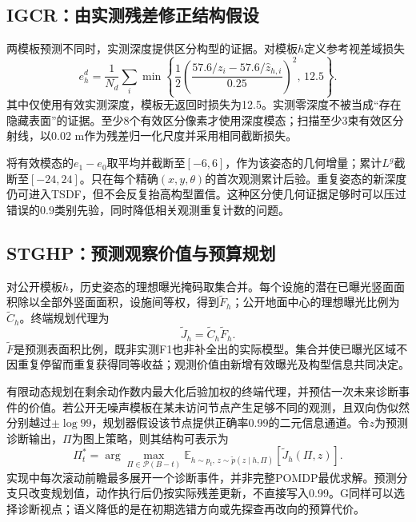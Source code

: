 \documentclass[11pt,a4paper]{article}
\begin{document}
\subsection{IGCR：由实测残差修正结构假设}
两模板预测不同时，实测深度提供区分构型的证据。对模板$h$定义参考视差域损失
\begin{equation}
e_h^d=\frac{1}{N_d}\sum_i
\min\!\left\{\frac12\left(\frac{57.6/z_i-57.6/\widehat z_{h,i}}{0.25}\right)^2,\,12.5\right\}.
\label{eq:residual}
\end{equation}
其中仅使用有效实测深度，模板无返回时损失为12.5。实测零深度不被当成“存在隐藏表面”的证据。至少8个有效区分像素才使用深度模态；扫描至少3束有效区分射线，以0.02 m作为残差归一化尺度并采用相同截断损失。

将有效模态的$e_1-e_0$取平均并截断至$[-6,6]$，作为该姿态的几何增量；累计$L^g$截断至$[-24,24]$。只在每个精确$(x,y,\theta)$的首次观测累计后验。重复姿态的新深度仍可进入TSDF，但不会反复抬高构型置信。这种区分使几何证据足够时可以压过错误的0.9类别先验，同时降低相关观测重复计数的问题。

\subsection{STGHP：预测观察价值与预算规划}
对公开模板$h$，历史姿态的理想曝光掩码取集合并。每个设施的潜在已曝光竖面面积除以全部外竖面面积，设施间等权，得到$\widetilde F_h$；公开地面中心的理想曝光比例为$\widetilde C_h$。终端规划代理为
\begin{equation}
\widetilde J_h=\widetilde C_h\widetilde F_h.
\label{eq:proxy}
\end{equation}
$\widetilde F$是预测表面积比例，既非实测F1也非补全出的实际模型。集合并使已曝光区域不因重复停留而重复获得同等收益；观测价值由新增有效曝光及构型信息共同决定。

有限动态规划在剩余动作数内最大化后验加权的终端代理，并预估一次未来诊断事件的价值。若公开无噪声模板在某未访问节点产生足够不同的观测，且双向伪似然分别越过$\pm\log99$，规划器假设该节点提供正确率0.99的二元信息通道。令$z$为预测诊断输出，$\Pi$为图上策略，则其结构可表示为
\begin{equation}
\Pi_t^*=\arg\max_{\Pi\in\mathcal P(B-t)}
\mathbb E_{h\sim p_t,\,z\sim\widetilde p(z\mid h,\Pi)}
[\widetilde J_h(\Pi,z)] .
\label{eq:planning}
\end{equation}
实现中每次滚动前瞻最多展开一个诊断事件，并非完整POMDP最优求解。预测分支只改变规划值，动作执行后仍按实际残差更新，不直接写入0.99。G同样可以选择诊断视点；语义降低的是在初期选错方向或先探查再改向的预算代价。
\end{document}
